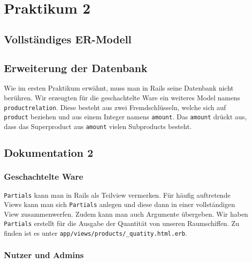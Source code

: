 \section{Praktikum 2}

\subsection{Vollst\"andiges ER-Modell}

\subsection{Erweiterung der Datenbank}
Wie im ersten Praktikum erw\"ahnt, muss man in Rails seine Datenbank nicht ber\"uhren. Wir erzeugten f\"ur die geschachtelte Ware ein weiteres Model namens \texttt{productrelation}. Diese besteht aus zwei Fremdschl\"usseln, welche sich auf \texttt{product} beziehen und aus einem Integer namens \texttt{amount}. Das \texttt{amount} dr\"uckt aus, dass das Superproduct aus \texttt{amount} vielen Subproducts besteht. 

\subsection{Dokumentation 2}

\subsubsection{Geschachtelte Ware}
\texttt{Partials} kann man in Rails als Teilview vermerken. F\"ur h\"aufig auftretende Views kann man sich \texttt{Partials} anlegen und diese dann in einer vollst\"andigen View zusammenwerfen. Zudem kann man auch Argumente \"ubergeben. Wir haben \texttt{Partials} erstellt f\"ur die Ausgabe der Quantit\"at von unseren Raumschiffen. Zu finden ist es unter \texttt{app/views/products/\_quatity.html.erb}. 

\subsubsection{Nutzer und Admins}


